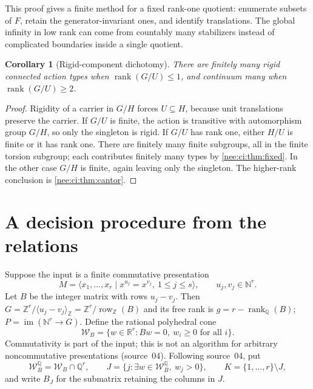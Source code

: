 \documentclass[11pt,letterpaper]{article}
\numberwithin{equation}{section}
\theoremstyle{plain}
\newtheorem{corollary}[corollary]{Corollary}
\theoremstyle{definition}
\theoremstyle{remark}
\newcommand{\NN}{\mathbb N}
\newcommand{\ZZ}{\mathbb Z}
\newcommand{\QQ}{\mathbb Q}
\newcommand{\RR}{\mathbb R}
\newcommand{\rank}{\operatorname{rank}}
\newcommand{\im}{\operatorname{im}}
\newcommand{\srcs}[1]{\par\noindent{\footnotesize\textit{Sources:} #1}\par}
\begin{document}
This proof gives a finite method for a fixed rank-one quotient:
enumerate subsets of $F$, retain the generator-invariant ones,
and identify translations. The global infinity in low rank can
come from countably many stabilizers instead of complicated
boundaries inside a single quotient.

\begin{corollary}[Rigid-component dichotomy]\label{nee:ci:cor:rigid-general}
There are finitely many rigid connected action types when
$\rank(G/U)\leq1$, and continuum many when $\rank(G/U)\geq2$.
\end{corollary}
\srcs{source~04, Corollary~4.2.}
\begin{proof}
Rigidity of a carrier in $G/H$ forces $U\subseteq H$, because
unit translations preserve the carrier. If $G/U$ is finite,
the action is transitive with automorphism group $G/H$, so
only the singleton is rigid.
If $G/U$ has rank one, either $H/U$ is finite or it has rank one.
There are finitely many finite subgroups, all in the finite torsion
subgroup; each contributes finitely many types by \cref{nee:ci:thm:fixed}.
In the other case $G/H$ is finite, again leaving only the singleton.
The higher-rank conclusion is \cref{nee:ci:thm:cantor}.
\end{proof}

\section{A decision procedure from the relations}\label{nee:aa:sec:effective}
\label{nee:ci:sec:effective}

Suppose the input is a finite commutative presentation
\[
M=\langle x_1,\ldots,x_r\mid x^{u_j}=x^{v_j},\ 1\leq j\leq s\rangle,
\qquad u_j,v_j\in\NN^r.
\]
Let $B$ be the integer matrix with rows $u_j-v_j$. Then
$G=\ZZ^r/\langle u_j-v_j\rangle_\ZZ=\ZZ^r/\operatorname{row}_\ZZ(B)$ and its free rank is
$g=r-\rank_\QQ(B)$; $P=\im(\NN^r\to G)$. Define the rational polyhedral cone
\[
\mathcal W_B=\{w\in\RR^r:Bw=0,\ w_i\geq0\text{ for all }i\}.
\]
Commutativity is part of the input; this is not an algorithm for
arbitrary noncommutative presentations (source~04). Following source~04, put
\[
\mathcal W_B^{\QQ}=\mathcal W_B\cap\QQ^r,\qquad
J=\{j:\exists w\in\mathcal W_B^{\QQ},\ w_j>0\},\qquad
K=\{1,\ldots,r\}\setminus J,
\]
and write $B_J$ for the submatrix retaining the columns in $J$.
\end{document}
